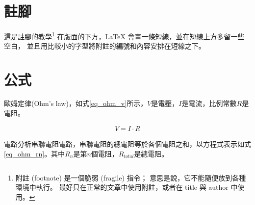 

\newpage






\newpage
\section{註腳}
這是註腳的教學\footnote{附註 (footnote) 是一個脆弱 (fragile) 指令； 意思是說，它不能隨便放到各種環境中執行。 最好只在正常的文章中使用附註，或者在 title 與 author 中使用。}
在版面的下方，LaTeX 會畫一條短線，並在短線上方多留一些空白， 並且用比較小的字型將附註的編號和內容安排在短線之下。
\newpage

\section{公式}

歐姆定律(Ohm's law)，如式\ref{eq_ohm_v}所示，$V$是電壓，$I$是電流，比例常數$R$是電阻。

\begin{equation}\label{eq_ohm_v}
    \begin{split}
        V = I \cdot R
    \end{split}
\end{equation}

電路分析串聯電阻電路，串聯電阻的總電阻等於各個電阻之和，以方程式表示如式\ref{eq_ohm_rn}。其中$R_{n}$是第$n$個電阻，$R_{total}$是總電阻。

